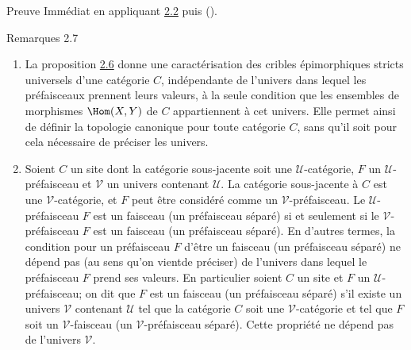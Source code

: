 \begin{enonce*}[remark]{Preuve}
Immédiat en appliquant \hyperref[II.prop2.2]{2.2} puis ().
\end{enonce*}

\begin{enonce*}[remark]{Remarques 2.7}
\begin{enumerate}
\renewcommand{\labelenumi}{\theenumi)}
\item La proposition \hyperref[II.prop2.6]{2.6} donne une caractérisation des cribles
  épimorphiques stricts universels d'une catégorie $C$,
  indépendante de l'univers dans lequel les préfaisceaux prennent
  leurs valeurs, à la seule condition que les ensembles de
  morphismes $\Hom(X,Y)$ de $C$ appartiennent à cet univers. Elle
  permet ainsi de définir la topologie canonique pour toute
  catégorie $C$, sans qu'il soit pour cela nécessaire de
  préciser les univers.

\item Soient $C$ un site dont la catégorie sous-jacente soit une
  $𝒰$-catégorie, $F$ un $𝒰$-préfaisceau et
  $𝒱$ un univers contenant $𝒰$. La catégorie
  sous-jacente à $C$ est une $𝒱$-catégorie, et $F$ peut
  être considéré comme un $𝒱$-préfaisceau. Le
  $𝒰$-préfaisceau $F$ est un faisceau (\resp un
  préfaisceau séparé) si et seulement si le
  $𝒱$-préfaisceau $F$ est un faisceau (\resp un
  préfaisceau séparé). En d'autres termes, la condition pour un
  préfaisceau $F$ d'être un faisceau (\resp un préfaisceau
  séparé) ne dépend pas (au sens qu'on vient\pageoriginale de
  préciser) de l'univers dans lequel le préfaisceau $F$ prend ses
  valeurs. En particulier soient $C$ un site et $F$ un
  $𝒰$-préfaisceau; on dit que $F$ est un faisceau (\resp un
  préfaisceau séparé) s'il existe un univers $𝒱$
  contenant $𝒰$ tel que la catégorie $C$ soit une
  $𝒱$-catégorie et tel que $F$ soit un $𝒱$-faisceau
  (\resp un $𝒱$-préfaisceau séparé). Cette propriété
  ne dépend pas de l'univers $𝒱$.
\end{enumerate}
\end{enonce*}

